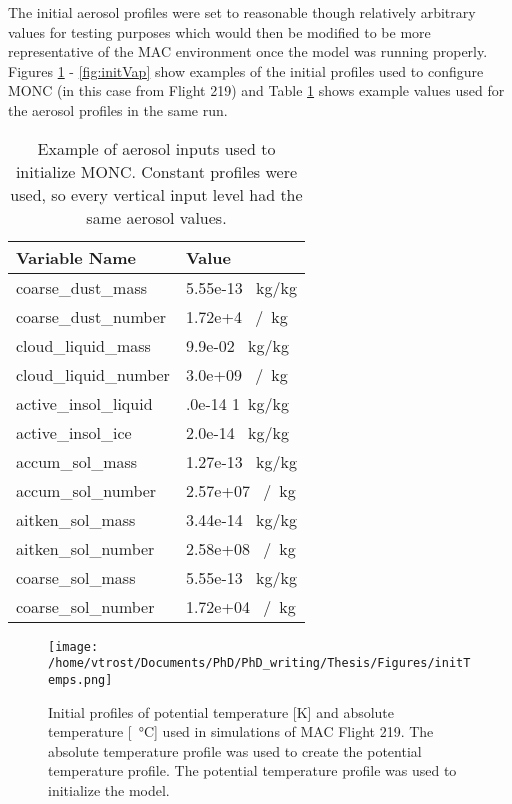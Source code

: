 The initial aerosol profiles were set to reasonable though relatively arbitrary values for testing purposes which would then be modified to be more representative of the MAC environment once the model was running properly. Figures \ref{fig:initTheta} - \ref{fig:initVap} show examples of the initial profiles used to configure MONC (in this case from Flight 219) and Table \ref{tab:initAero} shows example values used for the aerosol profiles in the same run.

\begin{table}[H]
	\centering
	\small
	\caption{Example of aerosol inputs used to initialize MONC. Constant profiles were used, so every vertical input level had the same aerosol values.}
	\label{tab:initAero}
	\begin{tabular}{|p{5cm}|p{5cm}|}
		\hline
		\textbf{Variable Name} & \textbf{Value}       \\ \hline
		coarse\_dust\_mass     & 5.55e-13 \SI{}{kg/kg} \\ \hline
		coarse\_dust\_number   & 1.72e+4 \SI{}{/kg}    \\ \hline
		cloud\_liquid\_mass    & 9.9e-02 \SI{}{kg/kg}  \\ \hline
		cloud\_liquid\_number  & 3.0e+09 \SI{}{/kg}    \\ \hline
		active\_insol\_liquid  & .0e-14 \SI{1}{kg/kg}  \\ \hline
		active\_insol\_ice     & 2.0e-14 \SI{}{kg/kg}  \\ \hline
		accum\_sol\_mass        & 1.27e-13 \SI{}{kg/kg} \\ \hline
		accum\_sol\_number     & 2.57e+07 \SI{}{/kg}   \\ \hline
		aitken\_sol\_mass      & 3.44e-14 \SI{}{kg/kg} \\ \hline
		aitken\_sol\_number    & 2.58e+08 \SI{}{/kg}   \\ \hline
		coarse\_sol\_mass      & 5.55e-13 \SI{}{kg/kg} \\ \hline
		coarse\_sol\_number    & 1.72e+04 \SI{}{/kg}   \\ \hline
	\end{tabular}%
\end{table}
\newpage
\begin{figure}[H]
	\centering
	\texttt{[image: /home/vtrost/Documents/PhD/PhD\_writing/Thesis/Figures/initTemps.png]}
	\caption{Initial profiles of potential temperature [K] and absolute temperature [\SI{}{\degreeCelsius}] used in simulations of MAC Flight 219. The absolute temperature profile was used to create the potential temperature profile. The potential temperature profile was used to initialize the model.}
	\label{fig:initTheta}
\end{figure}

